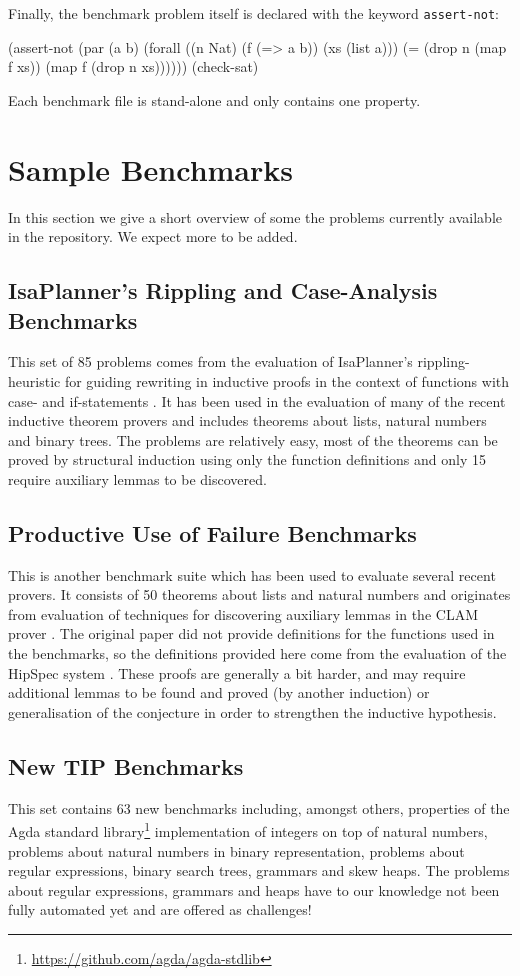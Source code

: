 \documentclass{llncs}
\begin{document}
Finally, the benchmark problem itself is declared with the keyword \texttt{assert-not}:

\begin{code}
(assert-not
  (par (a b)
    (forall ((n Nat) (f (=> a b)) (xs (list a)))
      (= (drop n (map f xs)) (map f (drop n xs))))))
(check-sat)
\end{code}
Each benchmark file is stand-alone and only contains one property.

\section{Sample Benchmarks}
In this section we give a short overview of  some the problems currently available in the repository. We expect more to be added.

\subsection{IsaPlanner's Rippling and Case-Analysis Benchmarks}
\label{sec:isap}
This set of 85 problems comes from the evaluation of IsaPlanner's rippling-heuristic for guiding rewriting in inductive proofs in the context of functions with case- and if-statements \cite{IsaPcase}. It has been used in the evaluation of many of the recent inductive theorem provers and includes theorems about lists, natural numbers and binary trees. The problems are relatively easy, most of the theorems can be proved by structural induction using only the function definitions and only 15 require auxiliary lemmas to be discovered.

\subsection{Productive Use of Failure Benchmarks}
This is another benchmark suite which has been used to evaluate several recent provers. It consists of 50 theorems about lists and natural numbers and originates from evaluation of techniques for discovering auxiliary lemmas in the CLAM prover \cite{productiveuse}. The original paper did not provide definitions for the functions used in the benchmarks, so the definitions provided here come from the evaluation of the HipSpec system \cite{hipspecCADE}. These proofs are generally a bit harder, and may require additional lemmas to be found and proved (by another induction) or generalisation of the conjecture in order to strengthen the inductive hypothesis.

\subsection{New TIP Benchmarks}
This set contains 63 new benchmarks including, amongst others,
properties of the Agda standard
library\footnote{\url{https://github.com/agda/agda-stdlib}}
implementation of integers on top of natural numbers, problems about natural numbers in binary representation, problems about regular expressions, binary search trees, grammars and skew heaps. The problems about regular expressions, grammars and heaps have to our knowledge not been fully automated yet and are offered as challenges!
\end{document}
